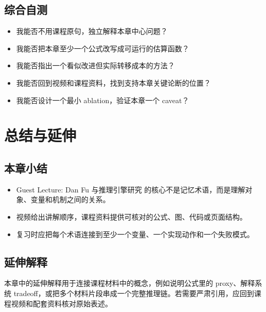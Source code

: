 \documentclass[a4paper]{article}
\begin{document}
\subsection{综合自测}
\begin{itemize}
\item 我能否不用课程原句，独立解释本章中心问题？
\item 我能否把本章至少一个公式改写成可运行的估算函数？
\item 我能否指出一个看似改进但实际转移成本的方法？
\item 我能否回到视频和课程资料，找到支持本章关键论断的位置？
\item 我能否设计一个最小 ablation，验证本章一个 caveat？
\end{itemize}
\section{总结与延伸}
\subsection{本章小结}
\begin{itemize}
\item Guest Lecture: Dan Fu 与推理引擎研究 的核心不是记忆术语，而是理解对象、变量和机制之间的关系。
\item 视频给出讲解顺序，课程资料提供可核对的公式、图、代码或页面结构。
\item 复习时应把每个术语连接到至少一个变量、一个实现动作和一个失败模式。
\end{itemize}
\subsection{延伸解释}
本章中的延伸解释用于连接课程材料中的概念，例如说明公式里的 proxy、解释系统 tradeoff，或把多个材料片段串成一个完整推理链。若需要严肃引用，应回到课程视频和配套资料核对原始表述。
\end{document}
